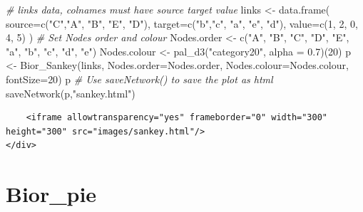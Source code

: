\documentclass[
]{book}
\newenvironment{Shaded}{\begin{snugshade}}{\end{snugshade}}
\newcommand{\AttributeTok}[1]{\textcolor[rgb]{0.77,0.63,0.00}{#1}}
\newcommand{\CommentTok}[1]{\textcolor[rgb]{0.56,0.35,0.01}{\textit{#1}}}
\newcommand{\DecValTok}[1]{\textcolor[rgb]{0.00,0.00,0.81}{#1}}
\newcommand{\FloatTok}[1]{\textcolor[rgb]{0.00,0.00,0.81}{#1}}
\newcommand{\FunctionTok}[1]{\textcolor[rgb]{0.00,0.00,0.00}{#1}}
\newcommand{\NormalTok}[1]{#1}
\newcommand{\OtherTok}[1]{\textcolor[rgb]{0.56,0.35,0.01}{#1}}
\newcommand{\StringTok}[1]{\textcolor[rgb]{0.31,0.60,0.02}{#1}}
\begin{document}
\begin{Shaded}
\begin{Highlighting}[]
\CommentTok{\# links data, colnames must have \textquotesingle{}source\textquotesingle{} \textquotesingle{}target\textquotesingle{} \textquotesingle{}value\textquotesingle{}}
\NormalTok{links }\OtherTok{\textless{}{-}} \FunctionTok{data.frame}\NormalTok{(}
  \AttributeTok{source=}\FunctionTok{c}\NormalTok{(}\StringTok{"C"}\NormalTok{,}\StringTok{"A"}\NormalTok{, }\StringTok{"B"}\NormalTok{, }\StringTok{"E"}\NormalTok{, }\StringTok{"D"}\NormalTok{), }
  \AttributeTok{target=}\FunctionTok{c}\NormalTok{(}\StringTok{"b"}\NormalTok{,}\StringTok{"c"}\NormalTok{, }\StringTok{"a"}\NormalTok{, }\StringTok{"e"}\NormalTok{, }\StringTok{"d"}\NormalTok{), }
  \AttributeTok{value=}\FunctionTok{c}\NormalTok{(}\DecValTok{1}\NormalTok{, }\DecValTok{2}\NormalTok{, }\DecValTok{0}\NormalTok{, }\DecValTok{4}\NormalTok{, }\DecValTok{5}\NormalTok{)}
\NormalTok{)}
\CommentTok{\# Set Nodes order and colour}
\NormalTok{Nodes.order }\OtherTok{\textless{}{-}} \FunctionTok{c}\NormalTok{(}\StringTok{"A"}\NormalTok{, }\StringTok{"B"}\NormalTok{, }\StringTok{"C"}\NormalTok{, }\StringTok{"D"}\NormalTok{, }\StringTok{"E"}\NormalTok{, }\StringTok{"a"}\NormalTok{, }\StringTok{"b"}\NormalTok{, }\StringTok{"c"}\NormalTok{, }\StringTok{"d"}\NormalTok{, }\StringTok{"e"}\NormalTok{)}
\NormalTok{Nodes.colour }\OtherTok{\textless{}{-}} \FunctionTok{pal\_d3}\NormalTok{(}\StringTok{"category20"}\NormalTok{, }\AttributeTok{alpha =} \FloatTok{0.7}\NormalTok{)(}\DecValTok{20}\NormalTok{)}
\NormalTok{p }\OtherTok{\textless{}{-}} \FunctionTok{Bior\_Sankey}\NormalTok{(links, }\AttributeTok{Nodes.order=}\NormalTok{Nodes.order, }\AttributeTok{Nodes.colour=}\NormalTok{Nodes.colour, }\AttributeTok{fontSize=}\DecValTok{20}\NormalTok{)}
\NormalTok{p}
\CommentTok{\# Use saveNetwork() to save the plot as html}
\FunctionTok{saveNetwork}\NormalTok{(p,}\StringTok{"sankey.html"}\NormalTok{)}
\end{Highlighting}
\end{Shaded}

\begin{verbatim}
    <iframe allowtransparency="yes" frameborder="0" width="300" height="300" src="images/sankey.html"/>
</div>
\end{verbatim}

\hypertarget{bior_pie}{%
\section{Bior\_pie}\label{bior_pie}}
\end{document}
